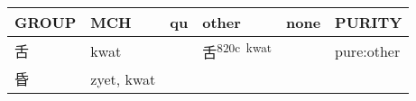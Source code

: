 \documentclass[14pt,a4paper]{scrartcl}
\begin{document}
\begin{longtable}[c]{@{}llllll@{}}
\toprule
\begin{minipage}[b]{0.14\columnwidth}\raggedright\strut
GROUP
\strut\end{minipage} &
\begin{minipage}[b]{0.14\columnwidth}\raggedright\strut
MCH
\strut\end{minipage} &
\begin{minipage}[b]{0.14\columnwidth}\raggedright\strut
qu
\strut\end{minipage} &
\begin{minipage}[b]{0.14\columnwidth}\raggedright\strut
other
\strut\end{minipage} &
\begin{minipage}[b]{0.14\columnwidth}\raggedright\strut
none
\strut\end{minipage} &
\begin{minipage}[b]{0.14\columnwidth}\raggedright\strut
PURITY
\strut\end{minipage}\tabularnewline
\midrule
\endhead
\begin{minipage}[t]{0.14\columnwidth}\raggedright\strut
舌
\strut\end{minipage} &
\begin{minipage}[t]{0.14\columnwidth}\raggedright\strut
kwat
\strut\end{minipage} &
\begin{minipage}[t]{0.14\columnwidth}\raggedright\strut
\strut\end{minipage} &
\begin{minipage}[t]{0.14\columnwidth}\raggedright\strut
舌\textsuperscript{820c~kwat}
\strut\end{minipage} &
\begin{minipage}[t]{0.14\columnwidth}\raggedright\strut
\strut\end{minipage} &
\begin{minipage}[t]{0.14\columnwidth}\raggedright\strut
pure:other
\strut\end{minipage}\tabularnewline
\begin{minipage}[t]{0.14\columnwidth}\raggedright\strut
昏
\strut\end{minipage} &
\begin{minipage}[t]{0.14\columnwidth}\raggedright\strut
zyet, kwat
\strut\end{minipage} &
\begin{minipage}[t]{0.14\columnwidth}\raggedright\strut
\strut\end{minipage} &

\end{longtable}
\end{document}
